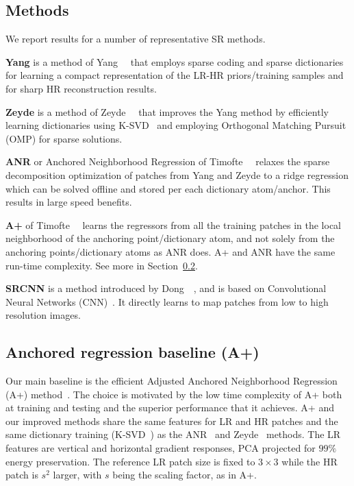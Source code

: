\documentclass[10pt,twocolumn,letterpaper]{article}
\begin{document}
\subsection{Methods}
\label{ssc:methods}
We report results for a number of representative SR methods.

\noindent\textbf{Yang } is a method of Yang~\etal~\cite{Yang-CVPR-2008} that employs sparse coding and sparse dictionaries for learning a compact representation of the LR-HR priors/training samples and for sharp HR reconstruction results.

\noindent\textbf{Zeyde } is a method of Zeyde~\etal~\cite{Zeyde-CS-2012} that improves the Yang method by efficiently learning dictionaries using K-SVD~\cite{Aharon-TSP-2006} and employing Orthogonal Matching Pursuit (OMP) for sparse solutions.

\noindent\textbf{ANR } or Anchored Neighborhood Regression of Timofte~\etal~\cite{Timofte-ICCV-2013} relaxes the sparse decomposition optimization of patches from Yang and Zeyde to a ridge regression which can be solved offline and stored per each dictionary atom/anchor. This results in large speed benefits.

\noindent\textbf{A+ } of Timofte~\etal~\cite{Timofte-ACCV-2014} learns the regressors from all the training patches in the local neighborhood of the anchoring point/dictionary atom, and not solely from the anchoring points/dictionary atoms as ANR does. A+ and ANR have the same run-time complexity. See more in Section~\ref{sec:Aplus}.

\noindent\textbf{SRCNN } is a method introduced by Dong~\etal~\cite{Dong-ECCV-2014}, and is based on Convolutional Neural Networks (CNN)~\cite{LeCun-IEEE-1998}. It directly learns to map patches from low to high resolution images.

\subsection{Anchored regression baseline (A+)}
\label{sec:Aplus}
Our main baseline is the efficient Adjusted Anchored Neighborhood Regression (A+) method~\cite{Timofte-ACCV-2014}. The choice is motivated by the low time complexity of A+ both at training and testing and the superior performance that it achieves.
A+ and our improved methods share the same features for LR and HR patches and the same dictionary training (K-SVD~\cite{Aharon-TSP-2006}) as the ANR~\cite{Timofte-ICCV-2013} and Zeyde~\cite{Zeyde-CS-2012} methods.
The LR features are vertical and horizontal gradient responses, PCA projected for $99\%$ energy preservation.
The reference LR patch size is fixed to $3\times3$ while the HR patch is $s^2$ larger, with $s$ being the scaling factor, as in A+.
\end{document}
